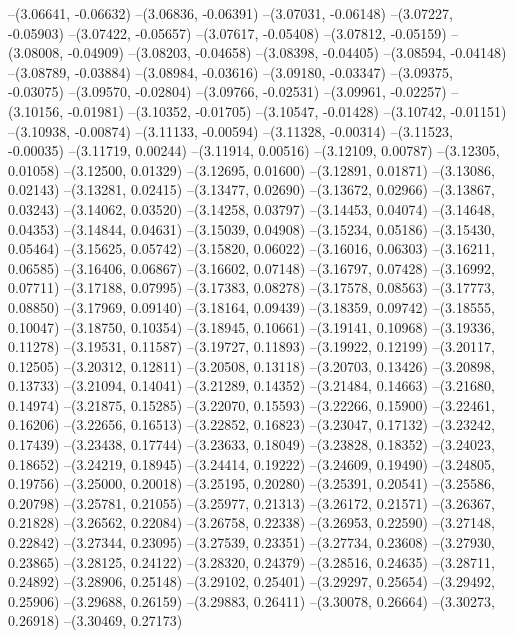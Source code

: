 --(3.06641, -0.06632)
--(3.06836, -0.06391)
--(3.07031, -0.06148)
--(3.07227, -0.05903)
--(3.07422, -0.05657)
--(3.07617, -0.05408)
--(3.07812, -0.05159)
--(3.08008, -0.04909)
--(3.08203, -0.04658)
--(3.08398, -0.04405)
--(3.08594, -0.04148)
--(3.08789, -0.03884)
--(3.08984, -0.03616)
--(3.09180, -0.03347)
--(3.09375, -0.03075)
--(3.09570, -0.02804)
--(3.09766, -0.02531)
--(3.09961, -0.02257)
--(3.10156, -0.01981)
--(3.10352, -0.01705)
--(3.10547, -0.01428)
--(3.10742, -0.01151)
--(3.10938, -0.00874)
--(3.11133, -0.00594)
--(3.11328, -0.00314)
--(3.11523, -0.00035)
--(3.11719, 0.00244)
--(3.11914, 0.00516)
--(3.12109, 0.00787)
--(3.12305, 0.01058)
--(3.12500, 0.01329)
--(3.12695, 0.01600)
--(3.12891, 0.01871)
--(3.13086, 0.02143)
--(3.13281, 0.02415)
--(3.13477, 0.02690)
--(3.13672, 0.02966)
--(3.13867, 0.03243)
--(3.14062, 0.03520)
--(3.14258, 0.03797)
--(3.14453, 0.04074)
--(3.14648, 0.04353)
--(3.14844, 0.04631)
--(3.15039, 0.04908)
--(3.15234, 0.05186)
--(3.15430, 0.05464)
--(3.15625, 0.05742)
--(3.15820, 0.06022)
--(3.16016, 0.06303)
--(3.16211, 0.06585)
--(3.16406, 0.06867)
--(3.16602, 0.07148)
--(3.16797, 0.07428)
--(3.16992, 0.07711)
--(3.17188, 0.07995)
--(3.17383, 0.08278)
--(3.17578, 0.08563)
--(3.17773, 0.08850)
--(3.17969, 0.09140)
--(3.18164, 0.09439)
--(3.18359, 0.09742)
--(3.18555, 0.10047)
--(3.18750, 0.10354)
--(3.18945, 0.10661)
--(3.19141, 0.10968)
--(3.19336, 0.11278)
--(3.19531, 0.11587)
--(3.19727, 0.11893)
--(3.19922, 0.12199)
--(3.20117, 0.12505)
--(3.20312, 0.12811)
--(3.20508, 0.13118)
--(3.20703, 0.13426)
--(3.20898, 0.13733)
--(3.21094, 0.14041)
--(3.21289, 0.14352)
--(3.21484, 0.14663)
--(3.21680, 0.14974)
--(3.21875, 0.15285)
--(3.22070, 0.15593)
--(3.22266, 0.15900)
--(3.22461, 0.16206)
--(3.22656, 0.16513)
--(3.22852, 0.16823)
--(3.23047, 0.17132)
--(3.23242, 0.17439)
--(3.23438, 0.17744)
--(3.23633, 0.18049)
--(3.23828, 0.18352)
--(3.24023, 0.18652)
--(3.24219, 0.18945)
--(3.24414, 0.19222)
--(3.24609, 0.19490)
--(3.24805, 0.19756)
--(3.25000, 0.20018)
--(3.25195, 0.20280)
--(3.25391, 0.20541)
--(3.25586, 0.20798)
--(3.25781, 0.21055)
--(3.25977, 0.21313)
--(3.26172, 0.21571)
--(3.26367, 0.21828)
--(3.26562, 0.22084)
--(3.26758, 0.22338)
--(3.26953, 0.22590)
--(3.27148, 0.22842)
--(3.27344, 0.23095)
--(3.27539, 0.23351)
--(3.27734, 0.23608)
--(3.27930, 0.23865)
--(3.28125, 0.24122)
--(3.28320, 0.24379)
--(3.28516, 0.24635)
--(3.28711, 0.24892)
--(3.28906, 0.25148)
--(3.29102, 0.25401)
--(3.29297, 0.25654)
--(3.29492, 0.25906)
--(3.29688, 0.26159)
--(3.29883, 0.26411)
--(3.30078, 0.26664)
--(3.30273, 0.26918)
--(3.30469, 0.27173)
